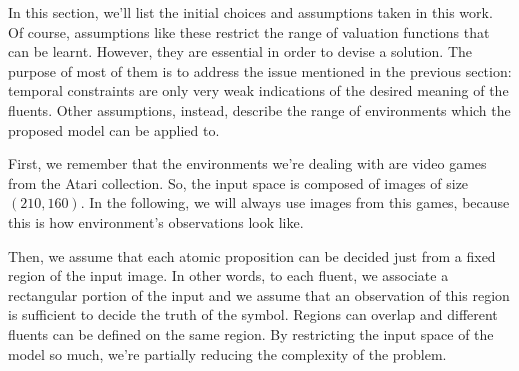In this section, we'll list the initial choices and assumptions taken in this
work.  Of course, assumptions like these restrict the range of valuation
functions that can be learnt. However, they are essential in order to devise a
solution.  The purpose of most of them is to address the issue mentioned in
the previous section: temporal constraints are only very weak indications of
the desired meaning of the fluents. Other assumptions, instead, describe the
range of environments which the proposed model can be applied to.

First, we remember that the environments we're dealing with are video games
from the Atari collection.  So, the input space is composed of images of size
$(210, 160)$. In the following, we will always use images from this games,
because this is how environment's observations look like.

Then, we assume that each atomic proposition can be decided just from a fixed
region of the input image. In other words, to each fluent, we associate a
rectangular portion of the input and we assume that an observation of this
region is sufficient to decide the truth of the symbol. Regions can overlap
and different fluents can be defined on the same region. By restricting the
input space of the model so much, we're partially reducing the complexity of
the problem.  


